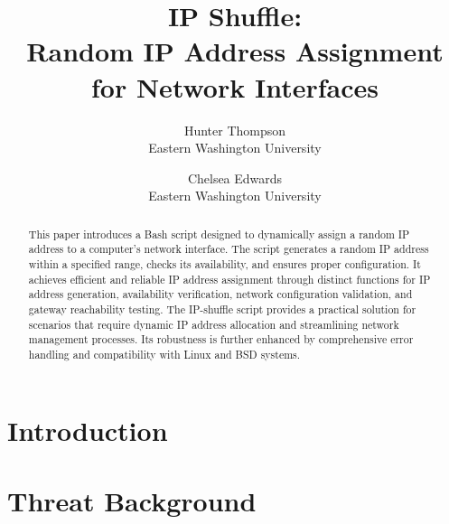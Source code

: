 \documentclass[tikz,letterpaper,twocolumn,10pt]{article}
\begin{document}

\date{}

\title{\Large \bf IP Shuffle:\\
  Random IP Address Assignment for Network Interfaces}

\author{
{\rm Hunter Thompson}\\
Eastern Washington University
\and
{\rm Chelsea Edwards}\\
Eastern Washington University
} %

\maketitle

\begin{abstract}
This paper introduces a Bash script designed to dynamically assign a random IP address to a computer's network interface. The script generates a random IP address within a specified range, checks its availability, and ensures proper configuration. It achieves efficient and reliable IP address assignment through distinct functions for IP address generation, availability verification, network configuration validation, and gateway reachability testing. The IP-shuffle script provides a practical solution for scenarios that require dynamic IP address allocation and streamlining network management processes. Its robustness is further enhanced by comprehensive error handling and compatibility with Linux and BSD systems.
\end{abstract}


\section{Introduction}


\section{Threat Background}

\end{document}
